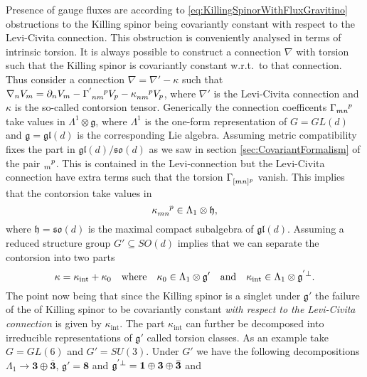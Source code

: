 Presence of gauge fluxes are according to \eqref{eq:KillingSpinorWithFluxGravitino} obstructions to the Killing spinor being covariantly constant with respect to the Levi-Civita connection. This obstruction is conveniently analysed in terms of intrinsic torsion. It is always possible to construct a connection $\nabla$ with torsion such that the Killing spinor is covariantly constant w.r.t.\ to that connection. Thus consider a connection $\nabla=\nabla'-\kappa$ such that $\nabla_n V_m=\pd_nV_m-\tensor{\Gamma}{^'_{nm}^p}V_p-\tensor{\kappa}{_{nm}^p}V_p$, where $\nabla'$ is the Levi-Civita connection and $\kappa$ is the so-called contorsion tensor. Generically the connection coefficents $\tensor{\Gamma}{_{mn}^p}$ take values in $\Lambda^1\otimes\mathfrak{g}$, where $\Lambda^1$ is the one-form representation of $G=GL(d)$ and $\mathfrak{g}=\mathfrak{gl}(d)$ is the corresponding Lie algebra. Assuming metric compatibility fixes the part in $\mathfrak{gl}(d)/\mathfrak{so}(d)$ as we saw in section \ref{sec:CovariantFormalism} of the pair $\tensor{}{_m^p}$. This is contained in the Levi-connection but the Levi-Civita connection have extra terms such that the torsion $\tensor{\Gamma}{_{[mn]^p}}$ vanish. This implies that the contorsion take values in 
\begin{equation}
    \tensor{\kappa}{_{mn}^p}\in \Lambda_1\otimes \mathfrak{h},
\end{equation}
where $\mathfrak{h}=\mathfrak{so}(d)$ is the maximal compact subalgebra of $\mathfrak{gl}(d)$. Assuming a reduced structure group $G'\subseteq SO(d)$ implies that we can separate the contorsion into two parts 
\begin{equation}
    \kappa = \kappa_\text{int}+\kappa_{0}\quad \text{where} \quad \kappa_{0}\in \Lambda_1\otimes \mathfrak{g}'\quad \text{and}\quad \kappa_{\text{int}}\in \Lambda_1\otimes \tensor{\mathfrak{g}}{^'^{\perp}}.
\end{equation}
The point now being that since the Killing spinor is a singlet under $\mathfrak{g}'$ the failure of the of Killing spinor to be covariantly constant \emph{with respect to the Levi-Civita connection} is given by $\kappa_{\text{int}}$. The part $\kappa_{\text{int}}$ can further be decomposed into irreducible representations of $\mathfrak{g}'$ called torsion classes. As an example take $G=GL(6)$ and $G'=SU(3)$. Under $G'$ we have the following decompositions $\Lambda_1\to \mathbf{3}\oplus\overbar{\mathbf{3}}$, $\mathfrak{g}'=\mathbf{8}$ and $\tensor{\mathfrak{g}}{^'^{\perp}}=\mathbf{1}\oplus\mathbf{3}\oplus\overbar{\mathbf{3}}$ and 
